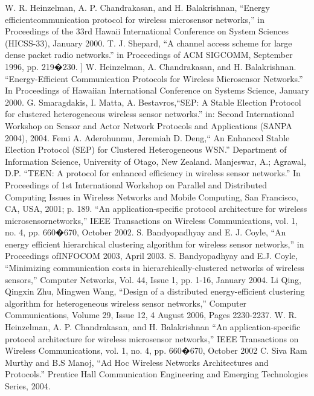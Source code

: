 \documentclass[conference]{IEEEtran}
\begin{document}
\begin{thebibliography}{1}

W. R. Heinzelman, A. P. Chandrakasan, and H. Balakrishnan, ``Energy efficientcommunication protocol for wireless microsensor networks,'' in Proceedings of the 33rd Hawaii International Conference on System Sciences (HICSS-33), January 2000.
T. J. Shepard, ``A channel access scheme for large dense packet radio networks.'' in Proccedings of ACM SIGCOMM, September 1996, pp. 219�230.
] W. Heinzelman, A. Chandrakasan, and H. Balakrishnan. ``Energy-Efficient Communication Protocols for Wireless Microsensor Networks.'' In Proceedings of Hawaiian International Conference on Systems Science, January 2000.
G. Smaragdakis, I. Matta, A. Bestavros,``SEP: A Stable Election Protocol for clustered heterogeneous wireless sensor networks.'' in: Second International Workshop on Sensor and Actor Network Protocols and Applications (SANPA 2004), 2004.
Femi A. Aderohunmu, Jeremiah D. Deng,`` An Enhanced Stable Election Protocol (SEP) for Clustered Heterogeneous WSN.'' Department of Information Science, University of Otago, New Zealand.
Manjeswar, A.; Agrawal, D.P. ``TEEN: A protocol for enhanced efficiency in wireless sensor networks.'' In Proceedings of 1st International Workshop on Parallel and Distributed Computing Issues in Wireless Networks and Mobile Computing, San Francisco, CA, USA, 2001; p. 189.
``An application-specific protocol architecture for wireless microsensornetworks,'' IEEE Transactions on Wireless Communications, vol. 1, no. 4, pp. 660�670, October 2002.
S. Bandyopadhyay and E. J. Coyle, ``An energy efficient hierarchical clustering algorithm for wireless sensor networks,'' in Proceedings ofINFOCOM 2003, April 2003.
S. Bandyopadhyay and E.J. Coyle, ``Minimizing communication costs in hierarchically-clustered networks of wireless sensors,'' Computer Networks, Vol. 44, Issue 1, pp. 1-16, January 2004.
Li Qing, Qingxin Zhu, Mingwen Wang, ``Design of a distributed energy-efficient clustering algorithm for heterogeneous wireless sensor networks,'' Computer Communications, Volume 29, Issue 12, 4 August 2006, Pages 2230-2237.
W. R. Heinzelman, A. P. Chandrakasan, and H. Balakrishnan ``An application-specific protocol architecture for wireless microsensor networks,'' IEEE Transactions on Wireless Communications, vol. 1, no. 4, pp. 660�670, October 2002
 C. Siva Ram Murthy and B.S Manoj, ``Ad Hoc Wireless Networks Architectures and Protocols.'' Prentice Hall Communication Engineering and Emerging Technologies Series, 2004.

\end{thebibliography}
\end{document}
